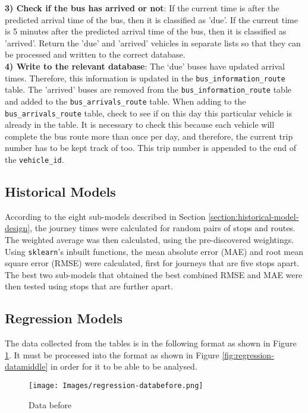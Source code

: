 \textbf{3) Check if the bus has arrived or not}:  If the current time is after the predicted arrival time of the bus, then it is classified as 'due'. If the current time is 5 minutes after the predicted arrival time of the bus, then it is classified as 'arrived'. Return the 'due' and 'arrived' vehicles in separate lists so that they can be processed and written to the correct database. \\

\textbf{4) Write to the relevant database}: The `due' buses have updated arrival times. Therefore, this information is updated in the \texttt{bus\_information\_route} table. The 'arrived' buses are removed from the \texttt{bus\_information\_route} table and added to the \texttt{bus\_arrivals\_route} table. When adding to the \texttt{bus\_arrivals\_route} table, check to see if on this day this particular vehicle is already in the table. It is necessary to check this because each vehicle will complete the bus route more than once per day, and therefore, the current trip number has to be kept track of too. This trip number is appended to the end of the \texttt{vehicle\_id}.

\subsection{Historical Models}

According to the eight sub-models described in Section \ref{section:historical-model-design}, the journey times were calculated for random pairs of stops and routes. The weighted average was then calculated, using the pre-discovered weightings. Using \texttt{sklearn}'s inbuilt functions, the mean absolute error (MAE) and root mean square error (RMSE) were calculated, first for journeys that are five stops apart. The best two sub-models that obtained the best combined RMSE and MAE were then tested using stops that are further apart. 

\subsection{Regression Models}

The data collected from the tables is in the following format as shown in Figure \ref{fig:regression-databefore}. It must be processed into the format as shown in Figure \ref{fig:regression-datamiddle} in order for it to be able to be analysed.

\begin{figure}[H]
\begin{center}
    \texttt{[image: Images/regression-databefore.png]}
    \caption{Data before}
    \label{fig:regression-databefore}
\end{center}
\end{figure}

